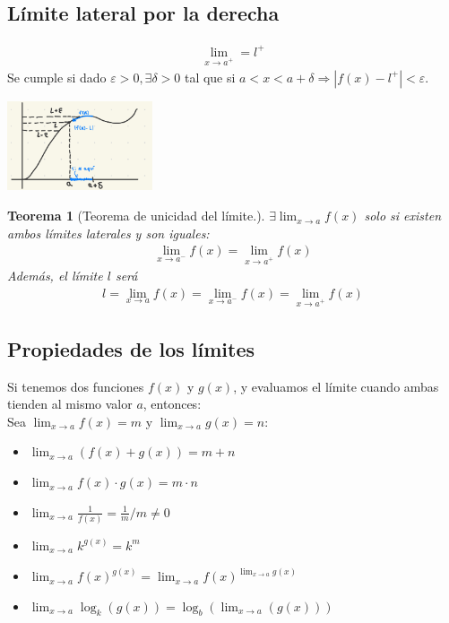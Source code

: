 \documentclass{article}
\newtheorem{unicidad}{Teorema}
\begin{document}
\subsection{Límite lateral por la derecha}
\begin{equation}
    \begin{split}
        \lim_{x \to a^+}=l^{+}
    \end{split}
\end{equation}
Se cumple si dado $\varepsilon>0, \exists \delta > 0$ tal que si $a<x<a+\delta \Rightarrow |f(x)-l^+|<\varepsilon$.\\
\begin{center}
    \includegraphics[height =100px]{limDerecha.jpg}
\end{center}
\begin{unicidad}[Teorema de unicidad del límite.]
    $\exists\lim_{x \to a} f(x)$ solo si existen ambos límites laterales y son iguales:
    \begin{equation}
        \begin{split}
            \lim_{x \to a^-} f(x)=\lim_{x \to a^+} f(x)
        \end{split}
    \end{equation}
    Además, el límite $l$ será
    \begin{equation}
        \begin{split}
            l = \lim_{x \to a} f(x)=\lim_{x \to a^-} f(x)=\lim_{x \to a^+} f(x)
        \end{split}
    \end{equation}
\end{unicidad}
\subsection{Propiedades de los límites}
Si tenemos dos funciones $f(x)$ y $g(x)$, y evaluamos el límite cuando ambas tienden al mismo valor $a$, entonces:\\
Sea $\lim_{x \to a}f(x)= m$ y $\lim_{x \to a}g(x)=n$:
\begin{itemize}
    \item $\lim_{x \to a} (f(x)+g(x))= m+n$
    \item $\lim_{x \to a} f(x) \cdot g(x)=m \cdot n$
    \item $\lim_{x \to a} \frac{1}{f(x)}= \frac{1}{m} / m \neq 0$
    \item $\lim_{x \to a} k ^{g(x)}= k^m$
    \item $\lim_{x \to a} f(x)^{g(x)}=\lim_{x \to a} f(x)^{\lim_{x \to a} g(x)}$
    \item $\lim_{x \to a} \log_k (g(x)) = \log_b(\lim_{x \to a}  (g(x)))$  
\end{itemize}
\end{document}
